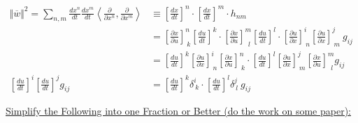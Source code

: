 \documentclass[12pt]{article}
\begin{document}
\vspace{15pt}
\(
	\begin{aligned}
		\Vert \overline{w} \Vert^2 = \sum_{n,m} \tfrac{dx^n}{dt} \tfrac{dx^m}{dt} 
			\left< \tfrac{\partial}{\partial x^n} , \tfrac{\partial}{\partial x^m} \right>
			& \equiv \left[\tfrac{dx}{dt}\right]^n \cdot \left[\tfrac{dx}{dt}\right]^m \cdot h_{nm}
			\\[-5pt]
		& = 
			\left[ \tfrac{\partial x}{\partial u} \right]^n_{\ k} \left[\tfrac{du}{dt}\right]^k 
			\cdot \left[ \tfrac{\partial x}{\partial u} \right]^m_{\ \ l} \left[\tfrac{du}{dt}\right]^l
			\cdot \left[ \tfrac{\partial u}{\partial x} \right]^i_{\ n} \left[ \tfrac{\partial u}{\partial x} \right]^j_{\ m} \ g_{ij}
			\\[5pt]
		& = 
			\left[\tfrac{du}{dt}\right]^k 
			\left[ \tfrac{\partial u}{\partial x} \right]^i_{\ n} 
			\left[ \tfrac{\partial x}{\partial u} \right]^n_{\ k} 
			\cdot \left[\tfrac{du}{dt}\right]^l
			\left[ \tfrac{\partial u}{\partial x} \right]^j_{\ m} 
			\left[ \tfrac{\partial x}{\partial u} \right]^m_{\ \ l}
			g_{ij} 
			\\[5pt]
		\boxed{ \left[\tfrac{du}{dt}\right]^i \left[\tfrac{du}{dt}\right]^j g_{ij} } 
			& = \left[\tfrac{du}{dt}\right]^k \delta^i_{\ k} \cdot \left[\tfrac{du}{dt}\right]^l \delta^j_{\ l} \ g_{ij}
	\end{aligned}
\)


\newpage
\underline{Simplify the Following into one Fraction or Better (do the work on some paper):}
\end{document}
